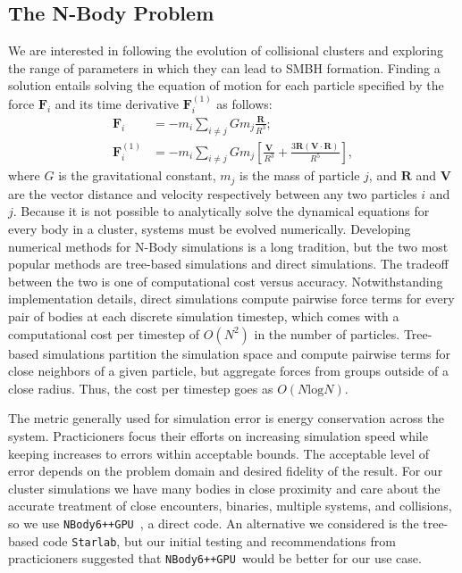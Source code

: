 \documentclass[preprint1]{aastex}
\newcommand\nbody{\texttt{NBody6++GPU }}
\numberwithin{equation}{section}
\begin{document}
\subsection{The N-Body Problem}
We are interested in following the evolution of collisional clusters and exploring the range of parameters in which they can lead to \ac{SMBH} formation. Finding a solution entails solving the equation of motion for each particle specified by the force $\mathbf{F}_{i}$ and its time derivative $\mathbf{F}^{(1)}_{i}$ as follows:
\begin{subequations}
    \begin{align}
    \mathbf{F}_{i} &= -m_{i}\sum_{i \neq j} Gm_{j} \frac{\mathbf{R}}{R^3}; \\
    \mathbf{F}^{(1)}_{i} &=  -m_{i}\sum_{i \neq j} Gm_{j} \left[ \frac{\mathbf{V}}{R^3} + \frac{3\mathbf{R}(\mathbf{V} \cdot \mathbf{R})}{R^5}\right],
    \end{align}
    \label{eqn:gravmotion}
\end{subequations}
where $G$ is the gravitational constant, $m_j$ is the mass of particle $j$, and $\mathbf{R}$ and $\mathbf{V}$ are the vector distance and velocity respectively between any two particles $i$ and $j$.  Because it is not possible to analytically solve the dynamical equations for every body in a cluster, systems must be evolved numerically. Developing numerical methods for N-Body simulations is a long tradition, but the two most popular methods are tree-based simulations and direct simulations. The tradeoff between the two is one of computational cost versus accuracy. Notwithstanding implementation details, direct simulations compute pairwise force terms for every pair of bodies at each discrete simulation timestep, which comes with a computational cost per timestep of $O(N^2)$ in the number of particles.  Tree-based simulations partition the simulation space and compute pairwise terms for close neighbors of a given particle, but aggregate forces from groups outside of a close radius. Thus, the cost per timestep goes as $O(N\mathrm{log}N)$.

The metric generally used for simulation error is energy conservation across the system. Practicioners focus their efforts on increasing simulation speed while keeping increases to errors within acceptable bounds. The acceptable level of error depends on the problem domain and desired fidelity of the result.  For our cluster simulations we have many bodies in close proximity and care about the accurate treatment of close encounters, binaries, multiple systems, and collisions, so we use \nbody, a direct code.  An alternative we considered is the tree-based code \texttt{Starlab}, but our initial testing and recommendations from practicioners suggested that \nbody would be better for our use case.
\end{document}
